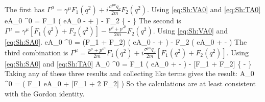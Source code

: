 The first has $	\Gamma^\mu = \gamma^\mu F_1(q^2) + i \frac{\sigma^{\mu\nu}q_\nu}{2m} F_2 (q^2)$.  Using \eqref{eq:Sh:VA0} and \eqref{eq:Sh:TA0}
\beq
	eA_0 \srb  \Gamma^0 \sr = 
		 F_1   \wxd \left( 
		eA_0  -  +  
		\right ) \wx
		- F_2    \wxd \left \{
			 -  
	\right \} \wx
\eeq
The second is	$\Gamma^\mu = \gamma^\mu [F_1(q^2) + F_2(q^2) ]  -  \frac{p^\mu  + p'^\mu }{2m}F_2 (q^2)$.  Using \eqref{eq:Sh:VA0} and \eqref{eq:Sh:SA0}.
\beq
	eA_0 \srb  \Gamma^0 \sr = 
		 (F_1 + F_2)  \wxd \left( 
		eA_0  -  +  
		\right ) \wx
		- F_2   \wxd \left( 
		eA_0  +   -  
		\right ) \wx
\eeq
The third combination is $	\Gamma^\mu = \frac{p^\mu  + p'^\mu }{2m} F_1(q^2) + i \frac{\sigma^{\mu\nu}q_\nu}{2m} [F_1(q^2) + F_2(q^2) ] $.  Using \eqref{eq:Sh:SA0} and \eqref{eq:Sh:TA0}
\beq
	 A_0 \srb  \Gamma^0 \sr = 
		F_1 \wxd \left( 
		eA_0  +   -  
		\right ) \wx
		- [F_1 + F_2] \wxd \left \{
			 -  
	\right \} \wx
\eeq
Taking any of these three results and collecting like terms gives the result:
\beq
		 A_0 \srb  \Gamma^0 \sr = \wxd \left(  
			F_1  eA_0
			+ [F_1 + 2 F_2] 
		\right ) \wx
\eeq
So the calculations are at least consistent with the Gordon identity.

